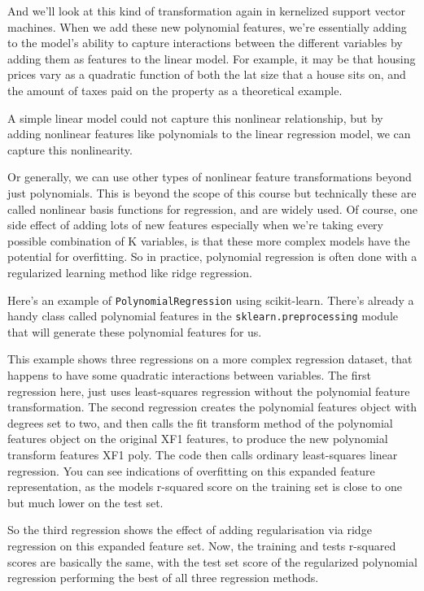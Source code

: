 \begin{multicols}{2}
And we'll look at this kind of transformation again in kernelized support vector machines. When we add these new polynomial features, we're essentially adding to the model's ability to capture interactions between the different variables by adding them as features to the linear model. For example, it may be that housing prices vary as a quadratic function of both the lat size that a house sits on, and the amount of taxes paid on the property as a theoretical example. 

A simple linear model could not capture this nonlinear relationship, but by adding nonlinear features like polynomials to the linear regression model, we can capture this nonlinearity. 

Or generally, we can use other types of nonlinear feature transformations beyond just polynomials. This is beyond the scope of this course but technically these are called nonlinear basis functions for regression, and are widely used. Of course, one side effect of adding lots of new features especially when we're taking every possible combination of K variables, is that these more complex models have the potential for overfitting. So in practice, polynomial regression is often done with a regularized learning method like ridge regression. 

Here's an example of \texttt{PolynomialRegression} using scikit-learn. There's already a handy class called polynomial features in the \texttt{sklearn.preprocessing} module that will generate these polynomial features for us. 

This example shows three regressions on a more complex regression dataset, that happens to have some quadratic interactions between variables. The first regression here, just uses least-squares regression without the polynomial feature transformation. The second regression creates the polynomial features object with degrees set to two, and then calls the fit transform method of the polynomial features object on the original XF1 features, to produce the new polynomial transform features XF1 poly. The code then calls ordinary least-squares linear regression. You can see indications of overfitting on this expanded feature representation, as the models r-squared score on the training set is close to one but much lower on the test set. 

So the third regression shows the effect of adding regularisation via ridge regression on this expanded feature set. Now, the training and tests r-squared scores are basically the same, with the test set score of the regularized polynomial regression performing the best of all three regression methods. 

\end{multicols}
